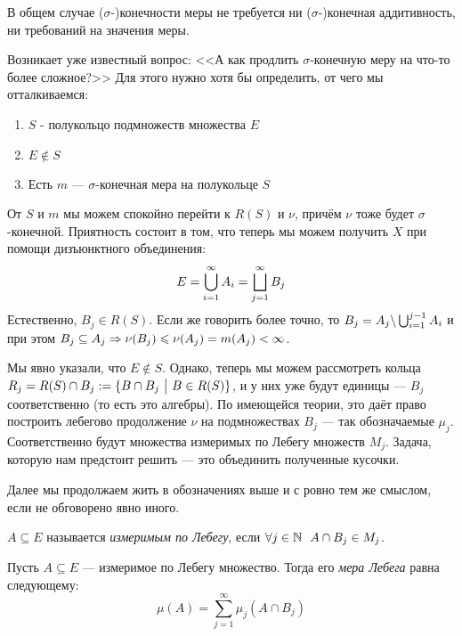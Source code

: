 \begin{note}
	В общем случае ($\sigma$-)конечности меры не требуется ни ($\sigma$-)конечная аддитивность, ни требований на значения меры.
\end{note}

\begin{note}
	Возникает уже известный вопрос: <<А как продлить $\sigma$-конечную меру на что-то более сложное?>> Для этого нужно хотя бы определить, от чего мы отталкиваемся:
	\begin{enumerate}
		\item $S$ - полукольцо подмножеств множества $E$
		
		\item $E \notin S$
		
		\item Есть $m$ --- $\sigma$-конечная мера на полукольце $S$
	\end{enumerate}
	От $S$ и $m$ мы можем спокойно перейти к $R(S)$ и $\nu$, причём $\nu$ тоже будет $\sigma$-конечной. Приятность состоит в том, что теперь мы можем получить $X$ при помощи дизъюнктного объединения:
	\[
		E = \bigcup_{i = 1}^\infty A_i = \bigsqcup_{j = 1}^\infty B_j
	\]
	Естественно, $B_j \in R(S)$. Если же говорить более точно, то $B_j = A_j \backslash \bigcup_{i = 1}^{j - 1} A_i$ и при этом $B_j \subseteq A_j \Rightarrow \nu(B_j) \leqslant \nu(A_j) = m(A_j) < \infty$.
	
	Мы явно указали, что $E \notin S$. Однако, теперь мы можем рассмотреть кольца $R_j = R(S) \cap B_j := \{B \cap B_j \ \big|\  B \in R(S)\}$, и у них уже будут единицы --- $B_j$ соответственно (то есть это алгебры). По имеющейся теории, это даёт право построить лебегово продолжение $\nu$ на подмножествах $B_j$ --- так обозначаемые $\mu_j$. Соответственно будут множества измеримых по Лебегу множеств $M_j$. Задача, которую нам предстоит решить --- это объединить полученные кусочки.
\end{note}

\begin{note}
	Далее мы продолжаем жить в обозначениях выше и с ровно тем же смыслом, если не обговорено явно иного.
\end{note}

\begin{definition}
	$A \subseteq E$ называется \textit{измеримым по Лебегу}, если $\forall j \in \mathbb{N}\ \ A \cap B_j \in M_j$.
\end{definition}

\begin{definition}
	Пусть $A \subseteq E$ --- измеримое по Лебегу множество. Тогда его \textit{мера Лебега} равна следующему:
	\[
		\mu(A) = \sum_{j = 1}^\infty \mu_j(A \cap B_j)
	\]
\end{definition}

